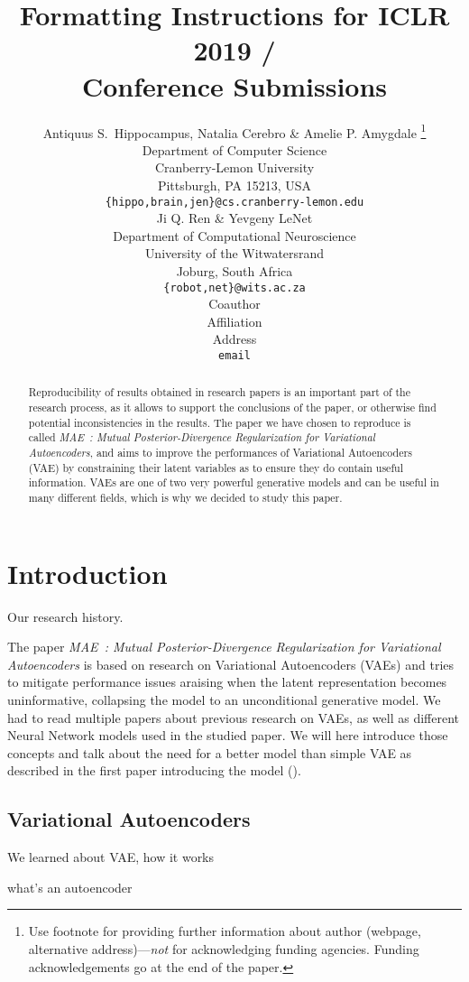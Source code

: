 \documentclass{article} %
\title{Formatting Instructions for ICLR 2019 / \\ Conference Submissions}
\author{Antiquus S.~Hippocampus, Natalia Cerebro \& Amelie P. Amygdale \thanks{ Use footnote for providing further information
about author (webpage, alternative address)---\emph{not} for acknowledging
funding agencies.  Funding acknowledgements go at the end of the paper.} \\
Department of Computer Science\\
Cranberry-Lemon University\\
Pittsburgh, PA 15213, USA \\
\texttt{\{hippo,brain,jen\}@cs.cranberry-lemon.edu} \\
\And
Ji Q. Ren \& Yevgeny LeNet \\
Department of Computational Neuroscience \\
University of the Witwatersrand \\
Joburg, South Africa \\
\texttt{\{robot,net\}@wits.ac.za} \\
\AND
Coauthor \\
Affiliation \\
Address \\
\texttt{email}
}
\begin{document}
\maketitle

\begin{abstract}
Reproducibility of results obtained in research papers is an important part of
the research process, as it allows to support the conclusions of the paper, or
otherwise find potential inconsistencies in the results. The paper we have
chosen to reproduce is called \textit{MAE~: Mutual Posterior-Divergence
  Regularization for Variational Autoencoders}, and aims to improve the
performances of Variational Autoencoders (VAE) by constraining their latent
variables as to ensure they do contain useful information. VAEs are one of two
very powerful generative models and can be useful in many different fields,
which is why we decided to study this paper.
\end{abstract}

\section {Introduction} %
Our research history.

The paper \textit{MAE~: Mutual Posterior-Divergence Regularization for Variational
Autoencoders} is based on research on Variational Autoencoders (VAEs) and tries
to mitigate performance issues araising when the latent representation becomes
uninformative, collapsing the model to an unconditional generative model. We had
to read multiple papers about previous research on VAEs, as well as different
Neural Network models used in the studied paper. We will here introduce those
concepts and talk about the need for a better model than simple VAE as described
in the first paper introducing the model (\citet{vae}).

\subsection {Variational Autoencoders}
We learned about VAE, how it works

what's an autoencoder
\end{document}
